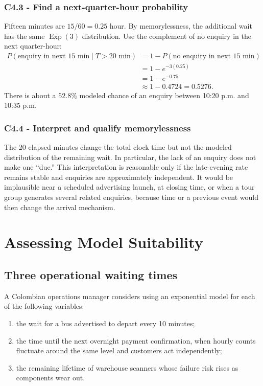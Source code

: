 \subsubsection*{C4.3 - Find a next-quarter-hour probability}\label{subsec:c4-memory-tourism-c}
Fifteen minutes are $15/60=0.25$ hour.  By memorylessness, the additional
wait has the same $\operatorname{Exp}(3)$ distribution.  Use the complement
of no enquiry in the next quarter-hour:
\[
\begin{aligned}
 P(\text{enquiry in next 15 min}\mid T>20\text{ min})
 &=1-P(\text{no enquiry in next 15 min})\\
 &=1-e^{-3(0.25)}\\
 &=1-e^{-0.75}\\
 &\approx1-0.4724=0.5276.
\end{aligned}
\]
There is about a $52.8\%$ modeled chance of an enquiry between 10:20 p.m.
and 10:35 p.m.

\subsubsection*{C4.4 - Interpret and qualify memorylessness}\label{subsec:c4-memory-tourism-d}
The 20 elapsed minutes change the total clock time but not the modeled
distribution of the remaining wait.  In particular, the lack of an enquiry
does not make one ``due.''  This interpretation is reasonable only if the
late-evening rate remains stable and enquiries are approximately independent.
It would be implausible near a scheduled advertising launch, at closing time,
or when a tour group generates several related enquiries, because time or a
previous event would then change the arrival mechanism.

\section{Assessing Model Suitability}\label{sec:c4-suitability}

\subsection{Three operational waiting times}\label{sec:c4-suitability-operations}
A Colombian operations manager considers using an exponential model for each
of the following variables:
\begin{enumerate}[label=(\roman*)]
 \item the wait for a bus advertised to depart every 10 minutes;
 \item the time until the next overnight payment confirmation, when hourly
 counts fluctuate around the same level and customers act independently;
 \item the remaining lifetime of warehouse scanners whose failure risk rises
 as components wear out.
\end{enumerate}

